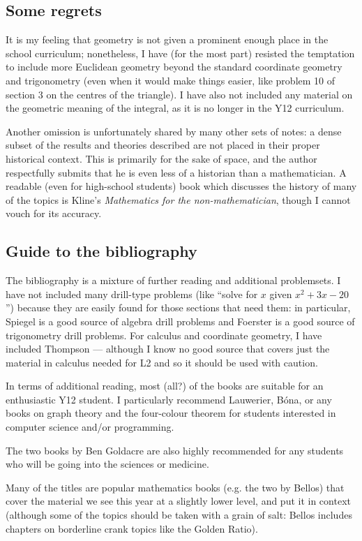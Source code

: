 \subsection*{Some regrets}
It is my feeling that geometry is not given a prominent enough place in the school curriculum; nonetheless, I have (for the most part) resisted
the temptation to include more Euclidean geometry beyond the standard coordinate geometry and trigonometry (even when it would make things easier,
like problem 10 of section 3 on the centres of the triangle). I have also not included any material on the geometric meaning of the integral, as
it is no longer in the Y12 curriculum.

Another omission is unfortunately shared by many other sets of notes: a dense subset of the results and theories described are not placed in their
proper historical context. This is primarily for the sake of space, and the author respectfully submits that he is even less of a historian than
a mathematician. A readable (even for high-school students) book which discusses the history of many of the topics is Kline's \emph{Mathematics
for the non-mathematician}, though I cannot vouch for its accuracy.

\subsection*{Guide to the bibliography}
The bibliography is a mixture of further reading and additional problemsets. I have not included many drill-type problems
(like ``solve for $ x $ given $ x^2 + 3x - 20 $'') because they are easily found for those sections that need them: in particular,
Spiegel is a good source of algebra drill problems and Foerster is a good source of trigonometry drill problems. For calculus
and coordinate geometry, I have included Thompson --- although I know no good source that covers just the material in calculus needed
for L2 and so it should be used with caution.

In terms of additional reading, most (all?) of the books are suitable for an enthusiastic Y12 student. I particularly recommend
Lauwerier, B\'ona, or any books on graph theory and the four-colour theorem for students interested in computer science and/or programming.

The two books by Ben Goldacre are also highly recommended for any students who will be going into the sciences or medicine.

Many of the titles are popular mathematics books (e.g. the two by Bellos) that cover the material we see this year at a slightly lower
level, and put it in context (although some of the topics should be taken with a grain of salt: Bellos includes chapters on borderline
crank topics like the Golden Ratio).

